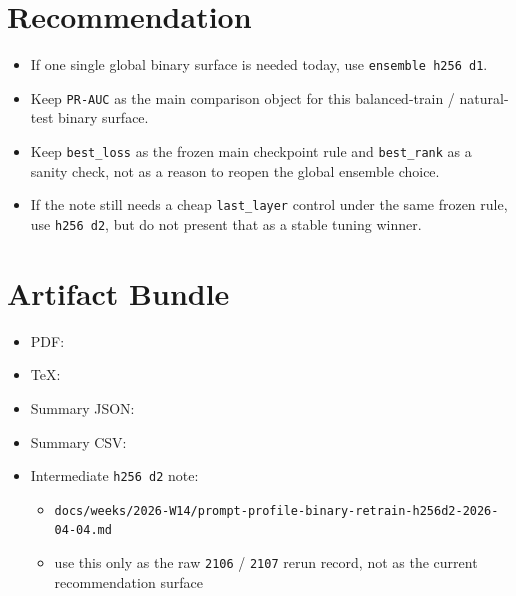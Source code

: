 \documentclass[11pt]{article}
\begin{document}
\section*{Recommendation}
\begin{itemize}[leftmargin=1.5em]
\item If one single global binary surface is needed today, use \texttt{ensemble h256 d1}.
\item Keep \texttt{PR-AUC} as the main comparison object for this balanced-train / natural-test binary surface.
\item Keep \texttt{best\_loss} as the frozen main checkpoint rule and \texttt{best\_rank} as a sanity check, not as a reason to reopen the global ensemble choice.
\item If the note still needs a cheap \texttt{last\_layer} control under the same frozen rule, use \texttt{h256 d2}, but do not present that as a stable tuning winner.
\end{itemize}

\section*{Artifact Bundle}
\begin{itemize}[leftmargin=1.5em]
\item PDF: 
\item TeX: 
\item Summary JSON: 
\item Summary CSV: 
\item Intermediate \texttt{h256 d2} note:
  \begin{itemize}[leftmargin=1.5em]
  \item \texttt{docs/weeks/2026-W14/prompt-profile-binary-retrain-h256d2-2026-04-04.md}
  \item use this only as the raw \texttt{2106} / \texttt{2107} rerun record, not as the current recommendation surface
  \end{itemize}
\end{itemize}
\end{document}
